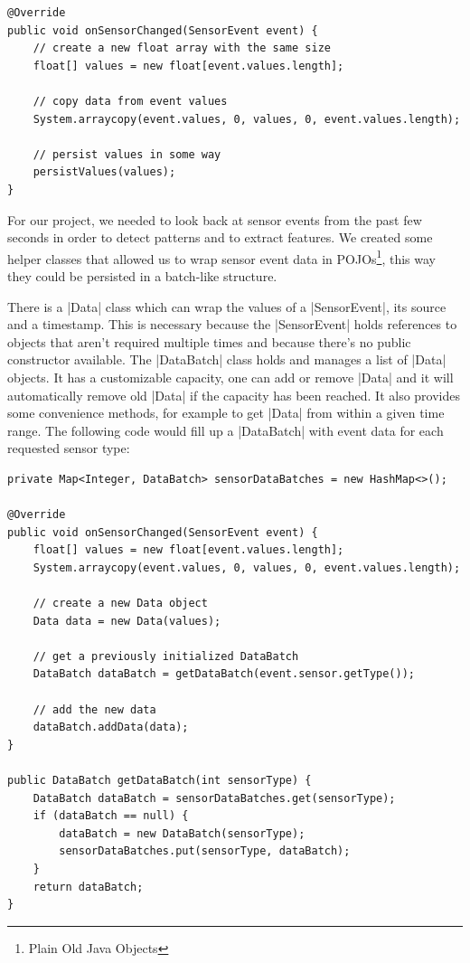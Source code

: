 \begin{lstlisting}[label=arraycopy]
@Override
public void onSensorChanged(SensorEvent event) {
	// create a new float array with the same size
	float[] values = new float[event.values.length];

	// copy data from event values
	System.arraycopy(event.values, 0, values, 0, event.values.length);

	// persist values in some way
	persistValues(values);
}
\end{lstlisting}

\clearpage

For our project, we needed to look back at sensor events from the past few seconds in order to detect patterns and to extract features.
We created some helper classes\cite{sensordatalogger:datapackage} that allowed us to wrap sensor event data in POJOs\footnote{Plain Old Java Objects}, this way they could be persisted in a batch-like structure.

There is a |Data|\cite{sensordatalogger:data} class which can wrap the values of a |SensorEvent|, its source and a timestamp.
This is necessary because the |SensorEvent| holds references to objects that aren't required multiple times and because there's no public constructor available. The |DataBatch|\cite{sensordatalogger:databatch} class holds and manages a list of |Data| objects.
It has a customizable capacity, one can add or remove |Data| and it will automatically remove old |Data| if the capacity has been reached.
It also provides some convenience methods, for example to get |Data| from within a given time range.
The following code would fill up a |DataBatch| with event data for each requested sensor type:

\begin{lstlisting}[label=datahelperclasses]
private Map<Integer, DataBatch> sensorDataBatches = new HashMap<>();

@Override
public void onSensorChanged(SensorEvent event) {
	float[] values = new float[event.values.length];
	System.arraycopy(event.values, 0, values, 0, event.values.length);

	// create a new Data object
	Data data = new Data(values);

	// get a previously initialized DataBatch
	DataBatch dataBatch = getDataBatch(event.sensor.getType());

	// add the new data
	dataBatch.addData(data);
}

public DataBatch getDataBatch(int sensorType) {
	DataBatch dataBatch = sensorDataBatches.get(sensorType);
	if (dataBatch == null) {
		dataBatch = new DataBatch(sensorType);
		sensorDataBatches.put(sensorType, dataBatch);
	}
	return dataBatch;
}
\end{lstlisting}

